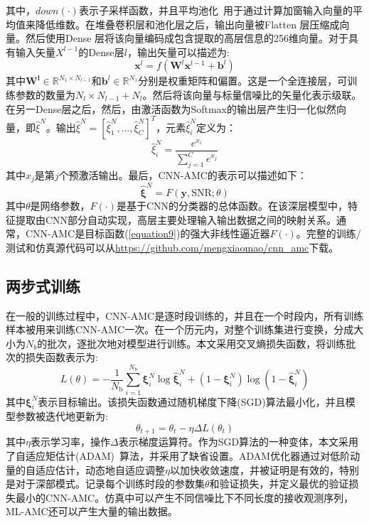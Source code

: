\documentclass[final]{cvpr}
\begin{document}
其中，$down(·)$表示子采样函数，并且平均池化~\cite{r36}用于通过计算加窗输入向量的平均值来降低维数。在堆叠卷积层和池化层之后，输出向量被Flatten 层压缩成向量。然后使用Dense 层将该向量编码成包含提取的高层信息的256维向量。对于具有输入矢量$X^{l−1}$的Dense层$l$，输出矢量可以描述为:
\begin{equation}
\mathbf{x}^{l}=f\left(\mathbf{W}^{l} \mathbf{x}^{l-1}+\mathbf{b}^{l}\right)\label{equation19}
\end{equation}
其中$\boldsymbol{W^l}\in \mathbb{R}^{N_1×N_{l−1}}$和$\boldsymbol{b}^l\in \mathbb{R}^{N_1}$分别是权重矩阵和偏置。这是一个全连接层，可训练参数的数量为$N_l\times N_{l−1}+N_l$。然后将该向量与标量信噪比的矢量化表示级联。
在另一Dense层之后，然后，由激活函数为Softmax的输出层产生归一化似然向量，即$\widehat{\xi}^N$。输出$\widehat{\xi}^N = [\widehat{\xi}^N_1,\dots,\widehat{\xi}^N_C]^T$，元素$\widehat{\xi}^N_i$定义为：
\begin{equation}
\hat{\xi}_{i}^{N}=\frac{e^{x_{i}}}{\sum_{j=1}^{C} e^{x_{j}}}\label{equation20}
\end{equation}
其中$x_j$是第$j$个预激活输出。最后，CNN-AMC的表示可以描述如下：
\begin{equation}
\hat{\boldsymbol{\xi}}^{N}=F(\mathbf{y}, \mathrm{SNR} ; \theta)\label{equation21}
\end{equation}
其中$\theta$是网络参数，$F(·)$是基于CNN的分类器的总体函数。在该深层模型中，特征提取由CNN部分自动实现，高层主要处理输入输出数据之间的映射关系。通常，CNN-AMC是目标函数(\ref{equation9})的强大非线性逼近器$F(·)$。完整的训练/测试和仿真源代码可以从\url{https://github.com/mengxiaomao/cnn_amc}下载。
\subsection{两步式训练}\label{Two-step}
在一般的训练过程中，CNN-AMC是逐时段训练的，并且在一个时段内，所有训练样本被用来训练CNN-AMC一次。在一个历元内，对整个训练集进行变换，分成大小为$N_b$的批次，逐批次地对模型进行训练。本文采用交叉熵损失函数，将训练批次的损失函数表示为:
\begin{equation}
L(\theta)=-\frac{1}{N_{\mathrm{b}}} \sum_{i=1}^{N_{\mathrm{b}}} \boldsymbol{\xi}_{i}^{N} \log \hat{\boldsymbol{\xi}}_{i}^{N}+\left(1-\boldsymbol{\xi}_{i}^{N}\right) \log \left(1-\hat{\boldsymbol{\xi}}_{i}^{N}\right)\label{equation22}
\end{equation}
其中$\boldsymbol{\xi}_{i}^{N}$表示目标输出。该损失函数通过随机梯度下降(SGD)算法最小化，并且模型参数被迭代地更新为:
\begin{equation}
\theta_{t+1}=\theta_{t}-\eta \Delta L\left(\theta_{t}\right)\label{equation23}
\end{equation}
其中$\eta$表示学习率，操作$\Delta$表示梯度运算符。作为SGD算法的一种变体，本文采用了自适应矩估计(ADAM)~\cite{r37}算法，并采用了缺省设置。ADAM优化器通过对低阶动量的自适应估计，动态地自适应调整$\eta$以加快收敛速度，并被证明是有效的，特别是对于深部模式。记录每个训练时段的参数集$\theta$和验证损失，并定义最优的验证损失最小的CNN-AMC。仿真中可以产生不同信噪比下不同长度的接收观测序列，ML-AMC还可以产生大量的输出数据。
\end{document}
